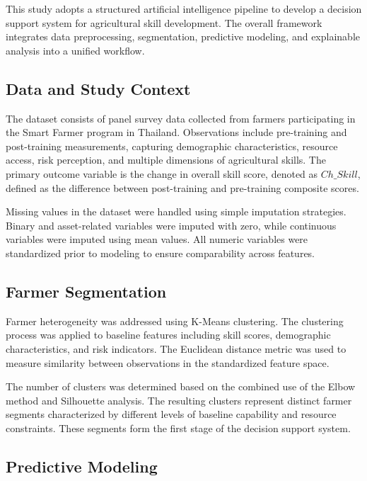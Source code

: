 This study adopts a structured artificial intelligence pipeline to develop a decision support system for agricultural skill development. The overall framework integrates data preprocessing, segmentation, predictive modeling, and explainable analysis into a unified workflow.

\subsection{Data and Study Context}

The dataset consists of panel survey data collected from farmers participating in the Smart Farmer program in Thailand. Observations include pre-training and post-training measurements, capturing demographic characteristics, resource access, risk perception, and multiple dimensions of agricultural skills. The primary outcome variable is the change in overall skill score, denoted as $Ch\_Skill$, defined as the difference between post-training and pre-training composite scores.

Missing values in the dataset were handled using simple imputation strategies. Binary and asset-related variables were imputed with zero, while continuous variables were imputed using mean values. All numeric variables were standardized prior to modeling to ensure comparability across features.

\subsection{Farmer Segmentation}

Farmer heterogeneity was addressed using K-Means clustering. The clustering process was applied to baseline features including skill scores, demographic characteristics, and risk indicators. The Euclidean distance metric was used to measure similarity between observations in the standardized feature space.

The number of clusters was determined based on the combined use of the Elbow method and Silhouette analysis\cite{rouseeuw1987}. The resulting clusters represent distinct farmer segments characterized by different levels of baseline capability and resource constraints. These segments form the first stage of the decision support system.

\subsection{Predictive Modeling}

